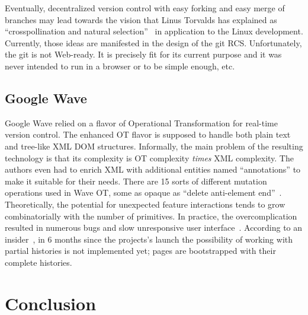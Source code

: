 \documentclass{sig-alternate}
\begin{document}
Eventually, decentralized version control with easy forking and easy merge of branches may lead towards the vision that Linus Torvalds has explained as ``crosspollination and natural selection''~\cite{linus-pollinates} in application to the Linux development.
Currently, those ideas are manifested in the design of the git RCS.
Unfortunately, the git is not Web-ready.
It is precisely fit for its current purpose and it was never intended to run in a browser or to be simple enough, etc.


\subsection{Google Wave}  \label{sec:waveot}

Google Wave relied on a flavor of Operational Transformation for
real-time version control. The enhanced OT flavor is supposed to
handle both plain text and tree-like XML DOM structures.
Informally, the main problem of the resulting technology is that
its complexity is OT complexity \emph{times} XML complexity. 
The authors even had to enrich XML with additional entities 
named ``annotations'' to make it suitable for their needs.
There are 15 sorts of different mutation operations used in Wave
OT, some as opaque as ``delete anti-element end''~\cite{waveot}.
Theoretically, the potential for unexpected feature interactions
tends to grow combinatorially with the number of primitives.
In practice, the overcomplication resulted in numerous bugs and
slow unresponsive user interface~\cite{own-experience}.
According to an insider~\cite{gerasimov}, in 6 months since the
projects's launch the possibility of working with partial
histories is not  implemented yet; pages are bootstrapped with
their complete histories. 


\section {Conclusion} \label{sec:conclusion}

\end{document}
